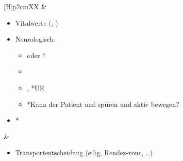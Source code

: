 {\begin{minipage}[t]{\linewidth -
{2\fboxrule} - {2\fboxsep}}
\begin{minipage}[t]{\linewidth}
{\begin{tabularx}{\linewidth}[H]{p{2cm}XX}
&
\begin{minipage}[t]{\linewidth}
\begin{itemize}
  \item Vitalwerte (, )
  \item Neurologisch:
  \begin{itemize}
    \item {} oder *
    \item {}
    \item {}, *UE
    \item *Kann der
    Patient  und  spüren und aktiv
    bewegen?
  \end{itemize}
  \item *
\end{itemize}
\end{minipage}
&
\noindent\color{Indigo}\begin{minipage}[t]{\linewidth}
\begin{itemize}
  \item Transportentscheidung (eilig, Rendez-vous, \ldots)
\end{itemize}
\end{minipage}
\\\addlinespace\midrule\addlinespace
\noindent{}



\end{tabularx}}
\end{minipage}
\end{minipage}}
